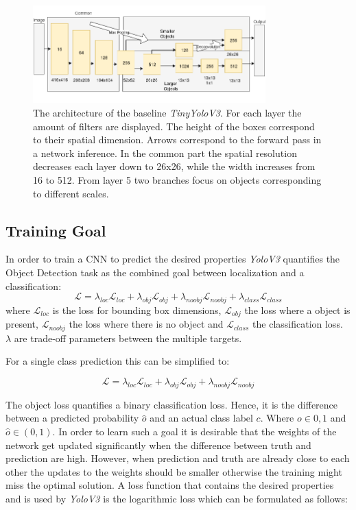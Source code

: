 			
	\begin{figure}[hbtp]
		\centering
		\includegraphics[width=0.8\textwidth]{fig/tinyyolov3_arch}
		\caption{The architecture of the baseline \textit{TinyYoloV3}. For each layer the amount of filters are displayed. The height of the boxes correspond to their spatial dimension. Arrows correspond to the forward pass in a network inference. In the common part the spatial resolution decreases each layer down to 26x26, while the width increases from 16 to 512. From layer 5 two branches focus on objects corresponding to different scales. }
		\label{fig:tinyyolov3_arch}
	\end{figure}
	

	\subsection{Training Goal}
	
	In order to train a \ac{CNN} to predict the desired properties \textit{YoloV3} quantifies the Object Detection task as the combined goal between localization and a classification:
	\begin{equation}
	\mathcal{L} = \lambda_{loc}\mathcal{L}_{loc} + \lambda_{obj}\mathcal{L}_{obj} + \lambda_{noobj}\mathcal{L}_{noobj} + \lambda_{class}\mathcal{L}_{class}
	\end{equation}
	where $\mathcal{L}_{loc}$ is the loss for bounding box dimensions, $\mathcal{L}_{obj}$ the loss where a object is present, $\mathcal{L}_{noobj}$ the loss where there is no object and $\mathcal{L}_{class}$ the classification loss. $\lambda$ are trade-off parameters between the multiple targets.
	
	For a single class prediction this can be simplified to:
	
	\begin{equation}
	\mathcal{L} = \lambda_{loc}\mathcal{L}_{loc} + \lambda_{obj}\mathcal{L}_{obj} + \lambda_{noobj}\mathcal{L}_{noobj}
	\end{equation}
	
	The object loss quantifies a binary classification loss. Hence, it is the difference between a predicted probability $\hat o$ and an actual class label $c$. Where $o \in {0,1}$ and $\hat o \in (0,1)$. In order to learn such a goal it is desirable that the weights of the network get updated significantly when the difference between truth and prediction are high. However, when prediction and truth are already close to each other the updates to the weights should be smaller otherwise the training might miss the optimal solution. A loss function that contains the desired properties and is used by \textit{YoloV3} is the logarithmic loss which can be formulated as follows:
	
